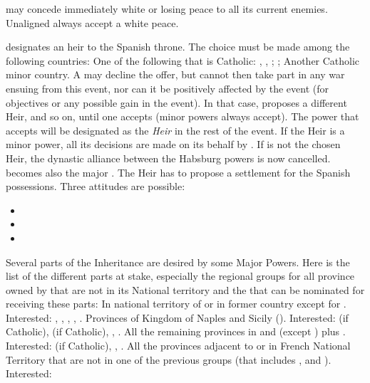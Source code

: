
\phevnt
\aparag \SPA may concede immediately white or losing peace to all its current
enemies. Unaligned \MIN always accept a white peace.

\phdipl
\aparag \SPA designates an heir to the Spanish throne. The choice must be made
among the following countries:
\bparag One of the following \MAJ that is Catholic: \FRA, \AUS, \ENG;
\bparag \AUSMin;
\bparag Another Catholic minor country.
\aparag A \MAJ may decline the offer, but cannot then take part in any war
ensuing from this event, nor can it be positively affected by the event (for
objectives or any possible gain in the event).
\bparag In that case, \SPA proposes a different Heir, and so on, until one
accepts (minor powers always accept).
\bparag The power that accepts will be designated as the \emph{Heir} in the
rest of the event.
\bparag If the Heir is a minor power, all its decisions are made on its behalf
by \SPA.
\aparag If \AUSaus is not the chosen Heir, the dynastic alliance between the
Habsburg powers is now cancelled.
\bparag \AUSMin becomes also the major \AUS.
\aparag The Heir has to propose a settlement for the Spanish
possessions. Three attitudes are possible:
\begin{itemize}
\item {}
\item {}
\item {}
\end{itemize}
\aparag Several parts of the Inheritance are desired by some Major Powers.
Here is the list of the different parts at stake, especially the regional
groups for all province owned by \SPA that are not in its National territory
and the \MAJ that can be nominated for receiving these parts:
 In national territory of \paysmajeurHollande or
in former country \paysBourgogne except for .
Interested: \FRA, \ENG, \AUS, \HOL, \SPA.
 Provinces of Kingdom of Naples and Sicily (\paysNaples).
Interested: \FRA (if Catholic), \ENG (if Catholic), \AUS, \SPA.
 All the remaining provinces in \regionItalie and
\payssuisse (except \provinceNice) plus \provinceMalta.  Interested: \FRA (if
Catholic), \AUS, \SPA.
 All the provinces adjacent to or in French National
Territory that are not in one of the previous groups (that includes
\provinceNice,  and \provinceRoussillon).  Interested:
